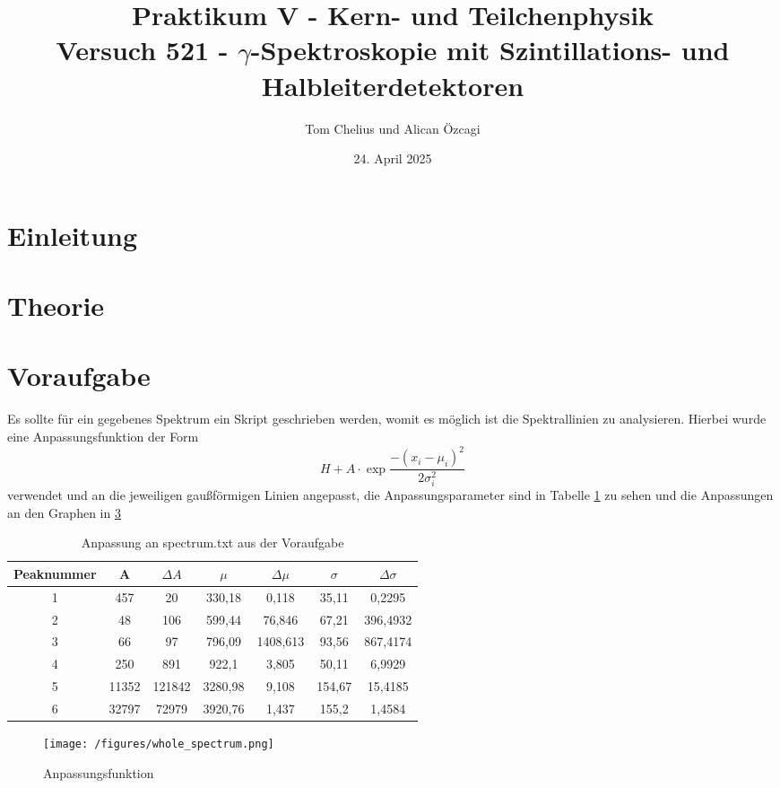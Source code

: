 \documentclass{article}
\title{Praktikum V - Kern- und Teilchenphysik\\Versuch 521 - $\gamma$-Spektroskopie mit Szintillations- und Halbleiterdetektoren}
\author{Tom Chelius und Alican Özcagi}
\date{24. April 2025}
\begin{document}
\maketitle
\tableofcontents

\newpage
\section{Einleitung}

\section{Theorie}

\section{Voraufgabe}
Es sollte für ein gegebenes Spektrum ein Skript geschrieben werden, womit es möglich ist die Spektrallinien zu analysieren. Hierbei wurde eine Anpassungsfunktion der Form
\begin{equation}
    H + A \cdot \exp{\frac{-(x_i-\mu_i )^2}{2 \sigma_i^2}}
\end{equation}
verwendet und an die jeweiligen gaußförmigen Linien angepasst, die Anpassungsparameter sind in Tabelle \ref{tab:voraufgabe} zu sehen und die Anpassungen an den Graphen in \ref{}


\begin{table}
    \centering
    \begin{tabular}{|c|c|c|c|c|c|c|} \hline
      Peaknummer & A & $\Delta A$ & $\mu$ & $\Delta \mu$ & $\sigma$ & $\Delta \sigma$\\ \hline \hline
      1 & 457 & 20 & 330,18 & 0,118 & 35,11 & 0,2295 \\ \hline
      2 & 48 & 106 & 599,44 & 76,846 & 67,21 & 396,4932 \\ \hline
      3 & 66 & 97 & 796,09 & 1408,613 & 93,56 & 867,4174 \\ \hline
      4 & 250 & 891 & 922,1 & 3,805 & 50,11 & 6,9929 \\ \hline
      5 & 11352 & 121842 & 3280,98 & 9,108 & 154,67 & 15,4185 \\ \hline
      6 & 32797 & 72979 & 3920,76 & 1,437 & 155,2 & 1,4584 \\ \hline
    \end{tabular}
    \caption{Anpassung an spectrum.txt aus der Voraufgabe}
    \label{tab:voraufgabe}
\end{table}

\begin{figure}
    \centering
    \texttt{[image: /figures/whole\_spectrum.png]}
    \caption{Anpassungsfunktion}
    \label{fig:voraufgabeFig}
\end{figure}
\end{document}
